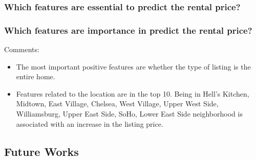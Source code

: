 \documentclass{beamer}
\begin{document}
\begin{frame}
 \frametitle{Which features are essential to predict the rental price?}
\begin{table}[H]
  \centering
  \caption{XGBoost Top 10 Feature Weights}
  \label{tab:xgb-weights}
\end{table}
\end{frame}

\begin{frame}
  \frametitle{Which features are importance in predict the rental price?}
  Comments:
 \begin{itemize}
    \item The most important positive features are whether the type of listing is the
  entire home.
    \item Features related to the location are in the top 10.  Being in  Hell's
    Kitchen, Midtown, East Village, Chelsea, West Village, Upper West Side,
    Williamsburg, Upper East Side, SoHo, Lower East Side neighborhood is associated
    with an increase in the listing price.
  \end{itemize}
\end{frame}

\subsection{Future Works}
\end{document}

